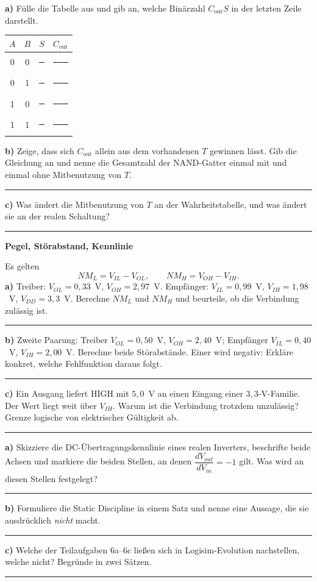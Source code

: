 \documentclass[10pt,a4paper]{article}
\newcommand{\titlepagepart}[2]{\vspace*{-4mm}{\sffamily\small #1}\par{\sffamily\LARGE\bfseries #2}\par\vspace{2mm}}
\newcommand{\block}[1]{\par\vspace{2mm}{\sffamily\large\bfseries #1}\par}
\newcommand{\antwort}[1]{\par\vspace{#1}\hrule\vspace{3mm}}
\newcommand{\lin}{\rule{11mm}{0.3pt}}
\begin{document}
\textbf{a)} Fülle die Tabelle aus und gib an, welche Binärzahl
$C_{\text{out}}S$ in der letzten Zeile darstellt.
\begin{center}
\begin{tabular}{cc|cc}\toprule
$A$&$B$&$S$&$C_{\text{out}}$\\\midrule
0&0&\lin&\lin\\
0&1&\lin&\lin\\
1&0&\lin&\lin\\
1&1&\lin&\lin\\\bottomrule
\end{tabular}
\end{center}
\textbf{b)} Zeige, dass sich $C_{\text{out}}$ allein aus dem vorhandenen $T$
gewinnen lässt. Gib die Gleichung an und nenne die Gesamtzahl der NAND-Gatter
einmal mit und einmal ohne Mitbenutzung von $T$.
\antwort{18mm}
\textbf{c)} Was ändert die Mitbenutzung von $T$ an der Wahrheitstabelle, und
was ändert sie an der realen Schaltung?
\antwort{13mm}

\newpage
\titlepagepart{04 / DIE ELEKTRISCHE SEITE · CA. 12 MINUTEN}{Pegel, Störabstand, Kennlinie}

\block{6. Störabstände berechnen}
Es gelten
\[
NM_L=V_{IL}-V_{OL},\qquad NM_H=V_{OH}-V_{IH}.
\]
\textbf{a)} Treiber: $V_{OL}=0{,}33$~V, $V_{OH}=2{,}97$~V. Empfänger:
$V_{IL}=0{,}99$~V, $V_{IH}=1{,}98$~V, $V_{DD}=3{,}3$~V. Berechne $NM_L$ und
$NM_H$ und beurteile, ob die Verbindung zulässig ist.
\antwort{22mm}
\textbf{b)} Zweite Paarung: Treiber $V_{OL}=0{,}50$~V, $V_{OH}=2{,}40$~V;
Empfänger $V_{IL}=0{,}40$~V, $V_{IH}=2{,}00$~V. Berechne beide Störabstände.
Einer wird negativ: Erkläre konkret, welche Fehlfunktion daraus folgt.
\antwort{24mm}
\textbf{c)} Ein Ausgang liefert HIGH mit $5{,}0$~V an einen Eingang einer
$3{,}3$-V-Familie. Der Wert liegt weit über $V_{IH}$. Warum ist die Verbindung
trotzdem unzulässig? Grenze logische von elektrischer Gültigkeit ab.
\antwort{22mm}

\block{7. Von der Kennlinie zur Regel}
\textbf{a)} Skizziere die DC-Übertragungskennlinie eines realen Inverters,
beschrifte beide Achsen und markiere die beiden Stellen, an denen
$\dfrac{dV_{out}}{dV_{in}}=-1$ gilt. Was wird an diesen Stellen festgelegt?
\antwort{40mm}
\textbf{b)} Formuliere die Static Discipline in einem Satz und nenne eine
Aussage, die sie ausdrücklich \emph{nicht} macht.
\antwort{20mm}
\textbf{c)} Welche der Teilaufgaben 6a--6c ließen sich in Logisim-Evolution
nachstellen, welche nicht? Begründe in zwei Sätzen.
\antwort{18mm}
\end{document}
